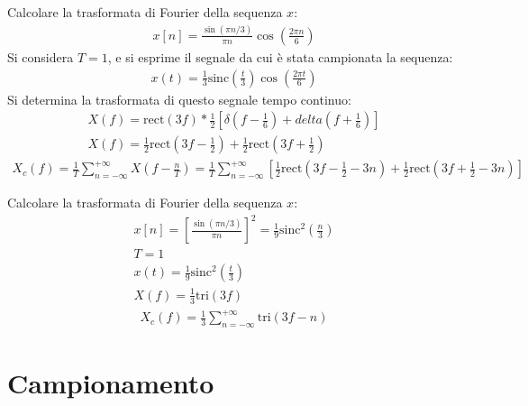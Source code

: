 \documentclass{article}
\newcommand{\rect}{\mathrm{rect}}
\newcommand{\sinc}{\mathrm{sinc}}
\newcommand{\tri}{\mathrm{tri}}
\begin{document}
Calcolare la trasformata di Fourier della sequenza $x$:
\begin{gather*}
    x[n]=\displaystyle\frac{\sin(\pi n/3)}{\pi n}\cos\left(\frac{2\pi n}{6}\right)
\end{gather*}
Si considera $T=1$, e si esprime il segnale da cui è stata campionata la sequenza:
\begin{gather*}
    x(t)=\frac{1}{3}\sinc\left(\frac{t}{3}\right)\cos\left(\frac{2\pi t}{6}\right)
\end{gather*}
Si determina la trasformata di questo segnale tempo continuo:
\begin{gather*}
    X(f)=\displaystyle\rect(3f)*\frac{1}{2}\left[\delta\left(f-\frac{1}{6}\right)+delta\left(f+\frac{1}{6}\right)\right]\\
    X(f)=\displaystyle\frac{1}{2}\rect\left(3f-\frac{1}{2}\right)+\frac{1}{2}\rect\left(3f+\frac{1}{2}\right)
\end{gather*}
\begin{gather}
    X_c(f)=\displaystyle\frac{1}{T}\sum_{n=-\infty}^{+\infty}X\left(f-\frac{n}{T}\right)=\frac{1}{T}\sum_{n=-\infty}^{+\infty}\left[\frac{1}{2}\rect\left(3f-\frac{1}{2}-3n\right)+\frac{1}{2}\rect\left(3f+\frac{1}{2}-3n\right)\right]
\end{gather}



Calcolare la trasformata di Fourier della sequenza $x$:
\begin{gather*}
    x[n]=\left[\displaystyle\frac{\sin(\pi n/3)}{\pi n}\right]^2=\frac{1}{9}\sinc^2\left(\frac{n}{3}\right)\\
    T=1\\
    x(t)=\displaystyle\frac{1}{9}\sinc^2\left(\frac{t}{3}\right)\\
    X(f)=\displaystyle \frac{1}{3}\tri (3f)
\end{gather*}
\begin{gather}
    X_c(f)=\displaystyle\frac{1}{3}\sum_{n=-\infty}^{+\infty}\tri (3f-n)
\end{gather}

\clearpage

\section{Campionamento}
\end{document}
